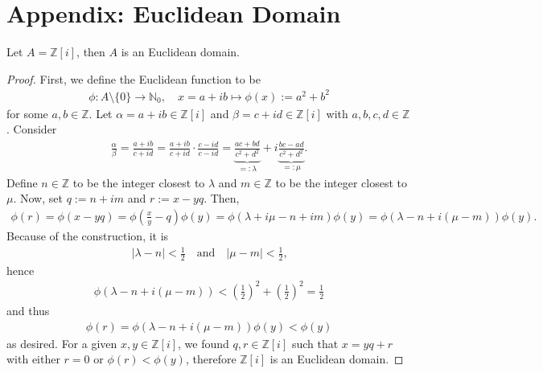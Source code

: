 \section{Appendix: Euclidean Domain}
\begin{exmbox}
    \begin{example}
        Let \(A = \mathbb{Z}[i]\), then \(A\) is an Euclidean domain.
    \end{example}
\end{exmbox}
\begin{proof}
    First, we define the Euclidean function to be
    \begin{align*}
        \phi: A \setminus \{0\} \longrightarrow \mathbb{N}_0, \quad x = a + i b \mapsto \phi(x) := a^2 + b^2
    \end{align*}
    for some \(a, b \in \mathbb{Z}\). Let \(\alpha = a + ib \in \mathbb{Z}[i]\) and \(\beta = c + id \in \mathbb{Z}[i]\) with \(a, b, c, d \in \mathbb{Z}\). Consider
    \begin{align*}
        \frac{\alpha}{\beta} = \frac{a + ib}{c + id} = \frac{a + ib}{c + id} \cdot \frac{c - id}{c - id} = \underbrace{\frac{ac + bd}{c^2 + d^2}}_{=: \lambda} + i \underbrace{\frac{bc - ad}{c^2 + d^2}}_{=: \mu} \text{.}
    \end{align*}
    Define \(n \in \mathbb{Z}\) to be the integer closest to \(\lambda\) and \(m \in \mathbb{Z}\) to be the integer closest to \(\mu\). Now, set \(q := n + im\) and \(r := x - yq\). Then,
    \begin{align*}
        \phi(r) = \phi(x - yq) = \phi\left( \frac{x}{y} - q \right) \phi(y) = \phi \left(\lambda + i \mu - n + im\right) \phi(y) = \phi \left(\lambda - n + i(\mu -m)\right) \phi(y) \text{.}
    \end{align*}
    Because of the construction, it is
    \begin{align*}
        |\lambda - n| < \frac{1}{2} \quad \text{and} \quad |\mu - m| < \frac{1}{2} \text{,}
    \end{align*}
    hence
    \begin{align*}
        \phi(\lambda - n + i (\mu - m)) < \left(\frac{1}{2}\right)^2 + \left(\frac{1}{2}\right)^2 = \frac{1}{2}
    \end{align*}
    and thus
    \begin{align*}
        \phi(r) = \phi(\lambda - n + i (\mu - m)) \phi(y) < \phi(y)
    \end{align*}
    as desired. For a given \(x, y \in \mathbb{Z}[i]\), we found \(q, r \in \mathbb{Z}[i]\) such that \(x = yq + r\) with either \(r = 0\) or \(\phi(r) < \phi(y)\), therefore \(\mathbb{Z}[i]\) is an Euclidean domain.
\end{proof}

